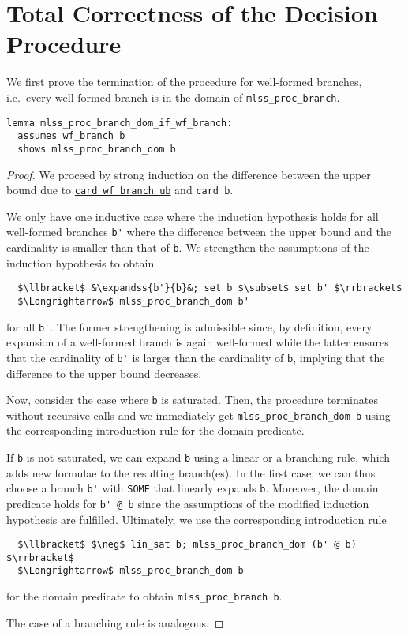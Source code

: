 \documentclass[sigplan,10pt,anonymous,review]{acmart}
\newcommand{\lefttriangle}{\mathrel{\tikz[baseline]{\draw (1ex, 0.75ex) -- (0, 1.25ex) -- (0, 0.25ex) -- cycle;}}}
\newcommand{\expandssSym}{\lefttriangle^*}
\newcommand{\expandss}[2]{#1 $\expandssSym$ #2}
\begin{document}
\section{Total Correctness of the Decision Procedure\label{sec:correct}}
We first prove the termination of the procedure for well-formed branches, i.e.\ every well-formed branch is in the domain of \lstinline!mlss_proc_branch!.
\begin{lstlisting}[belowskip=0pt]
lemma mlss_proc_branch_dom_if_wf_branch:
  assumes wf_branch b
  shows mlss_proc_branch_dom b
\end{lstlisting}
\begin{proof}
  We proceed by strong induction on the difference between the upper bound due to \hyperref[lst:card_branch]{\lstinline!card_wf_branch_ub!} and \lstinline!card b!.

  We only have one inductive case where the induction hypothesis holds for all well-formed branches \lstinline!b'! where the difference between the upper bound and the cardinality is smaller than that of \lstinline!b!.
  We strengthen the assumptions of the induction hypothesis to obtain
\begin{lstlisting}
  $\llbracket$ &\expandss{b'}{b}&; set b $\subset$ set b' $\rrbracket$
  $\Longrightarrow$ mlss_proc_branch_dom b'
\end{lstlisting}
for all \lstinline!b'!.
The former strengthening is admissible since, by definition, every expansion of a well-formed branch is again well-formed while the latter ensures that the cardinality of \lstinline!b'! is larger than the cardinality of \lstinline!b!, implying that the difference to the upper bound decreases.

Now, consider the case where \lstinline!b! is saturated.
Then, the procedure terminates without recursive calls and we immediately get \lstinline!mlss_proc_branch_dom b! using the corresponding introduction rule for the domain predicate.

If \lstinline!b! is not saturated, we can expand \lstinline!b! using a linear or a branching rule, which adds new formulae to the resulting branch(es).
In the first case, we can thus choose a branch \lstinline!b'! with \lstinline!SOME! that linearly expands \lstinline!b!.
Moreover, the domain predicate holds for \lstinline!b' @ b! since the assumptions of the modified induction hypothesis are fulfilled.
Ultimately, we use the corresponding introduction rule
\begin{lstlisting}
  $\llbracket$ $\neg$ lin_sat b; mlss_proc_branch_dom (b' @ b) $\rrbracket$
  $\Longrightarrow$ mlss_proc_branch_dom b
\end{lstlisting}
for the domain predicate to obtain \lstinline!mlss_proc_branch b!.

The case of a branching rule is analogous.
\end{proof}
\end{document}
